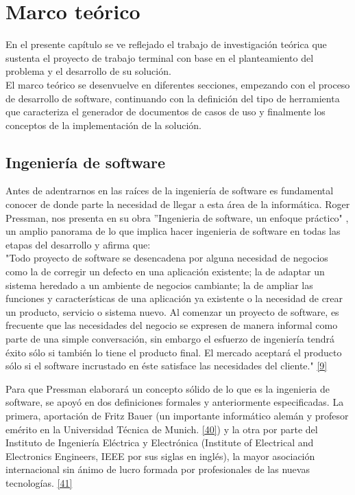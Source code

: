 \chapter{Marco teórico} \label{cap:tres}

En el presente capítulo se ve reflejado el trabajo de investigación teórica que sustenta el proyecto de trabajo terminal con base en el planteamiento del problema y el desarrollo de su solución.\\

El marco teórico se desenvuelve en diferentes secciones, empezando con el proceso de desarrollo de software, continuando con la definición del tipo de herramienta que caracteriza el generador de documentos de casos de uso y finalmente los conceptos de la implementación de la solución.

\section{Ingeniería de software}

Antes de adentrarnos en las raíces de la ingeniería de software es fundamental conocer de donde parte la necesidad de llegar a esta área de la informática. Roger Pressman, nos presenta en su obra ''Ingenieria de software, un enfoque práctico" , un amplio panorama de lo que implica hacer ingenieria de software en todas las etapas del desarrollo y afirma que:\\ 

"Todo proyecto de software se desencadena por alguna necesidad de negocios como la de corregir un defecto en una aplicación existente; la de adaptar un sistema heredado a un ambiente de negocios cambiante; la de ampliar las funciones y características de una aplicación ya existente o la necesidad de crear un producto, servicio o sistema nuevo. Al comenzar un proyecto de software, es frecuente que las necesidades del negocio se expresen de manera informal como parte de una simple conversación, sin embargo el esfuerzo de ingeniería tendrá éxito sólo si también lo tiene el producto final. El mercado aceptará el producto sólo si el software incrustado en éste satisface las necesidades del cliente." \hyperlink{b09}{[9]}\\

\newpage

Para que Pressman elaborará un concepto sólido de lo que es la ingenieria de software, se apoyó en dos definiciones formales y anteriormente especificadas. La primera, aportación de Fritz Bauer (un importante informático alemán y profesor emérito en la Universidad Técnica de Munich. \hyperlink{b40}{[40]}) y la otra por parte del Instituto de Ingeniería Eléctrica y Electrónica (Institute of Electrical and Electronics Engineers,  IEEE por sus siglas en inglés), la mayor asociación internacional sin ánimo de lucro formada por profesionales de las nuevas tecnologías. \hyperlink{b41}{[41]} \\

